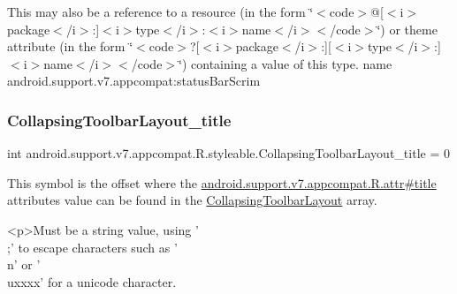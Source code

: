 This may also be a reference to a resource (in the form \char`\"{}$<$code$>$@\mbox{[}$<$i$>$package$<$/i$>$\+:\mbox{]}$<$i$>$type$<$/i$>$\+:$<$i$>$name$<$/i$>$$<$/code$>$\char`\"{}) or theme attribute (in the form \char`\"{}$<$code$>$?\mbox{[}$<$i$>$package$<$/i$>$\+:\mbox{]}\mbox{[}$<$i$>$type$<$/i$>$\+:\mbox{]}$<$i$>$name$<$/i$>$$<$/code$>$\char`\"{}) containing a value of this type.  name android.\+support.\+v7.\+appcompat\+:status\+Bar\+Scrim \mbox{\label{classandroid_1_1support_1_1v7_1_1appcompat_1_1R_1_1styleable_a287b485120735165da1ae86c6c16c174}} 
\subsubsection{\texorpdfstring{Collapsing\+Toolbar\+Layout\+\_\+title}{CollapsingToolbarLayout\_title}}
{\footnotesize\ttfamily int android.\+support.\+v7.\+appcompat.\+R.\+styleable.\+Collapsing\+Toolbar\+Layout\+\_\+title = 0\hspace{0.3cm}{\ttfamily [static]}}

This symbol is the offset where the \hyperlink{classandroid_1_1support_1_1v7_1_1appcompat_1_1R_1_1attr_a030356582065eaa1afdf1e3e37509b4c}{android.\+support.\+v7.\+appcompat.\+R.\+attr\#title} attribute\textquotesingle{}s value can be found in the \hyperlink{classandroid_1_1support_1_1v7_1_1appcompat_1_1R_1_1styleable_a8d282d917f35e5a08dd37db243410383}{Collapsing\+Toolbar\+Layout} array.

\begin{DoxyVerb}      <p>Must be a string value, using '\\;' to escape characters such as '\\n' or '\\uxxxx' for a unicode character.
\end{DoxyVerb}
 

